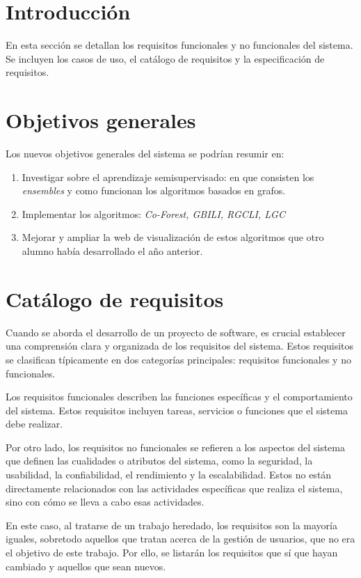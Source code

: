 \section{Introducción}
En esta sección se detallan los requisitos funcionales y no funcionales del sistema. Se incluyen los casos de uso, el catálogo de requisitos y la especificación de requisitos.

\section{Objetivos generales}
Los nuevos objetivos generales del sistema se podrían resumir en:

\begin{enumerate}
	\item Investigar sobre el aprendizaje semisupervisado: en que consisten los \textit{ensembles} y como funcionan los algoritmos basados en grafos.
	\item Implementar los algoritmos: \textit{Co-Forest, GBILI, RGCLI, LGC}
	\item Mejorar y ampliar la web de visualización de estos algoritmos que otro alumno había desarrollado el año anterior.
\end{enumerate}
\section{Catálogo de requisitos}
Cuando se aborda el desarrollo de un proyecto de software, es crucial establecer una comprensión clara y organizada de los requisitos del sistema. Estos requisitos se clasifican típicamente en dos categorías principales: requisitos funcionales y no funcionales.

Los requisitos funcionales describen las funciones específicas y el comportamiento del sistema. Estos requisitos incluyen tareas, servicios o funciones que el sistema debe realizar.

Por otro lado, los requisitos no funcionales se refieren a los aspectos del sistema que definen las cualidades o atributos del sistema, como la seguridad, la usabilidad, la confiabilidad, el rendimiento y la escalabilidad. Estos no están directamente relacionados con las actividades específicas que realiza el sistema, sino con cómo se lleva a cabo esas actividades.

En este caso, al tratarse de un trabajo heredado, los requisitos son la mayoría iguales, sobretodo aquellos que tratan acerca de la gestión de usuarios, que no era el objetivo de este trabajo. Por ello, se listarán los requisitos que sí que hayan cambiado y aquellos que sean nuevos.

